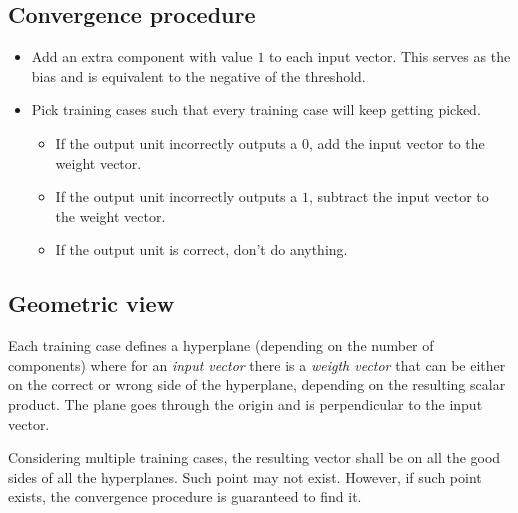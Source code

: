 \documentclass{article}
\begin{document}
\subsection{Convergence procedure}

\begin{itemize}
    \item Add an extra component with value \(1\) to each input vector.
        This serves as the bias and is equivalent to the negative of the threshold.
    \item Pick training cases such that every training case will keep getting picked.
    \begin{itemize}
        \item If the output unit incorrectly outputs a \(0\), add the input vector to the weight vector.
        \item If the output unit incorrectly outputs a \(1\), subtract the input vector to the weight vector.
        \item If the output unit is correct, don't do anything.
    \end{itemize}
\end{itemize}


\subsection{Geometric view}

Each training case defines a hyperplane (depending on the number of components) where
for an \textit{input vector} there is a \textit{weigth vector} that can be either on the
correct or wrong side of the hyperplane, depending on the resulting scalar product.
The plane goes through the origin and is perpendicular to the input vector.

Considering multiple training cases, the resulting vector shall be on all the good sides of all the hyperplanes.
Such point may not exist. However, if such point exists, the convergence procedure is guaranteed to find it.



\end{document}
